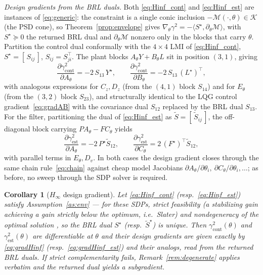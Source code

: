 \documentclass[twocolumn,amsthm]{autart}
\newtheorem{corollary}{Corollary}
\begin{document}
\emph{Design gradients from the BRL duals.} Both \eqref{eq:Hinf_cont} and
\eqref{eq:Hinf_est} are instances of \eqref{eq:generic}: the constraint is a
single conic inclusion $-\mathcal{M}(\cdot,\theta)\in\mathcal{K}$ (the PSD cone),
so Theorem~\ref{prop:envelope} gives
$\nabla_\theta \gamma^2 = -\langle S^\star, \partial_\theta \mathcal{M}\rangle$,
with $S^\star\succeq 0$ the returned BRL dual and $\partial_\theta\mathcal{M}$
nonzero only in the blocks that carry $\theta$. Partition the control dual
conformally with the $4\times4$ LMI of \eqref{eq:Hinf_cont},
$S^\star = [\,S_{ij}\,]$, $S_{ij}=S_{ji}^\top$. The plant blocks
$A_\theta Y + B_\theta L$ sit in position $(3,1)$, giving
\begin{equation}\label{eq:gradHinf}
\frac{\partial \gamma^2_{\mathrm{cont}}}{\partial A_\theta} = -2\,S_{13}\,Y^\star,
\qquad
\frac{\partial \gamma^2_{\mathrm{cont}}}{\partial B_\theta} = -2\,S_{13}\,(L^\star)^\top,
\end{equation}
with analogous expressions for $C_z, D_z$ (from the $(4,1)$ block $S_{14}$) and for
$E_\theta$ (from the $(3,2)$ block $S_{23}$), and structurally identical to the
LQG control gradient~\eqref{eq:gradAB} with the covariance dual $S_{12}$ replaced
by the BRL dual $S_{13}$. For the filter, partitioning the dual of
\eqref{eq:Hinf_est} as $\tilde S = [\,\tilde S_{ij}\,]$, the off-diagonal block
carrying $PA_\theta - FC_\theta$ yields
\begin{equation}\label{eq:gradHinf_est}
\frac{\partial \gamma^2_{\mathrm{est}}}{\partial A_\theta} = -2\,P^\star \tilde S_{12},
\qquad
\frac{\partial \gamma^2_{\mathrm{est}}}{\partial C_\theta} = 2\,(F^\star)^\top \tilde S_{12},
\end{equation}
with parallel terms in $E_\theta, D_v$. In both cases the design gradient closes
through the same chain rule~\eqref{eq:chain} against cheap model Jacobians
$\partial A_\theta/\partial\theta_i,\ \partial C_\theta/\partial\theta_i,\dots$;
as before, no sweep through the SDP solver is required.

\begin{corollary}[$H_\infty$ design gradient]\label{cor:hinf}
Let \eqref{eq:Hinf_cont} (resp.\ \eqref{eq:Hinf_est}) satisfy
Assumption~\ref{as:env} --- for these SDPs, strict feasibility (a stabilizing gain
achieving a gain strictly below the optimum, i.e.\ Slater) and nondegeneracy of
the optimal solution \cite{alizadeh1997complementarity}, so the BRL dual $S^\star$
(resp.\ $\tilde S^\star$) is unique. Then $\gamma^2_{\mathrm{cont}}(\theta)$ and
$\gamma^2_{\mathrm{est}}(\theta)$ are differentiable at $\theta$ and their design
gradients are given exactly by \eqref{eq:gradHinf} (resp.\ \eqref{eq:gradHinf_est})
and their analogs, read from the returned BRL duals. If strict complementarity
fails, Remark~\ref{rem:degenerate} applies verbatim and the returned dual yields a
subgradient.
\end{corollary}
\end{document}
